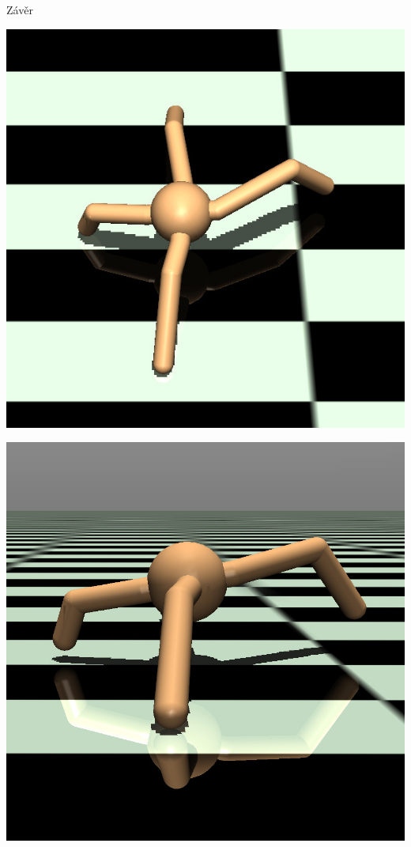 \documentclass[portrait,a0paper,fontscale=0.25]{baposter}
\begin{document}
\begin{poster}
\begin{posterbox}[column=1, name=conclusion, below=result1, bottomaligned=newsomething2]{Závěr}
\begin{center}
    \begin{minipage}{0.38\linewidth}
        \centering
        \includegraphics[width=0.95\linewidth]{../../BP/img/crop_exp2_para_top1.jpg}
    \end{minipage}%
    \begin{minipage}{0.38\linewidth}
        \centering
        \includegraphics[width=0.95\linewidth]{../../BP/img/crop_exp2_para_side1.jpg}
    \end{minipage}


\end{center}
\end{posterbox}
\end{poster}
\end{document}
